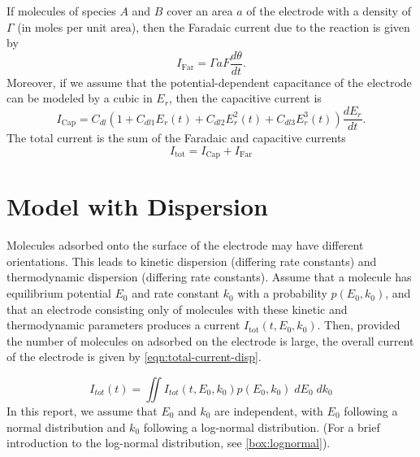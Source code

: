 \documentclass[twocolumn]{article}
\begin{document}
	If molecules of species $A$ and $B$ cover an area $a$ of the electrode with a density of $\Gamma$ (in moles per unit area), then the Faradaic current due to the reaction is given by
	\begin{equation}
		I_{\mathrm{Far}} = \Gamma a F \frac{d\theta}{dt}.
	\end{equation}
	Moreover, if we assume that the potential-dependent capacitance of the electrode can be modeled by a cubic in $E_r$, then the capacitive current is
	\begin{equation}
		I_\mathrm{Cap} = C_{dl} (1 + C_{dl1}E_r(t) + C_{dl2} E_r^2(t) + C_{dl3} E_r^3(t)) \frac{dE_r}{dt}.
	\end{equation}
	The total current is the sum of the Faradaic and capacitive currents
	\begin{equation}
		I_\mathrm{tot} = I_\mathrm{Cap} + I_{\mathrm{Far}}
	\end{equation}
	
	\section{Model with Dispersion}
	
	Molecules adsorbed onto the surface of the electrode may have different orientations.  This leads to kinetic dispersion (differing rate constants) and thermodynamic dispersion (differing rate constants).  Assume that a molecule has equilibrium potential $E_0$ and rate constant $k_0$ with a probability $p(E_0,k_0)$, and that an electrode consisting only of molecules with these kinetic and thermodynamic parameters produces a current $I_\mathrm{tot}(t, E_0, k_0)$.  Then, provided the number of molecules on adsorbed on the electrode is large, the overall current of the electrode is given by \cref{eqn:total-current-disp}.
	
	\begin{equation}\label{eqn:total-current-disp}
		I_{tot}(t) = \iint I_{tot}(t, E_0, k_0) p(E_0, k_0)\; dE_0\;dk_0
	\end{equation}
	In this report, we assume that $E_0$ and $k_0$ are independent, with $E_0$ following a normal distribution and $k_0$ following a log-normal distribution.  (For a brief introduction to the log-normal distribution, see \cref{box:lognormal}).
	
\end{document}
